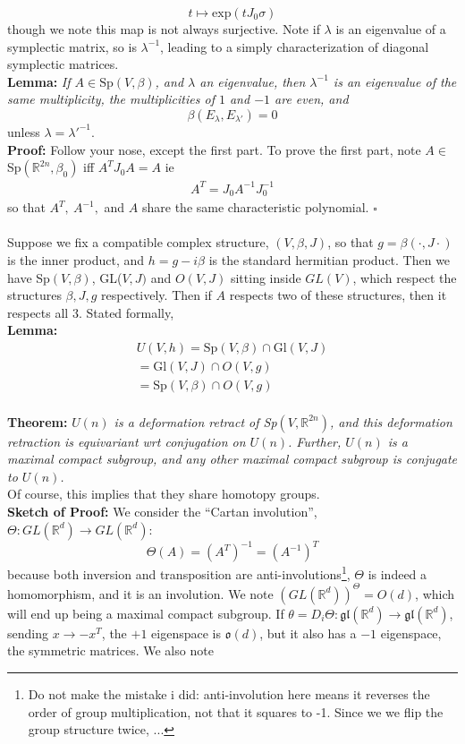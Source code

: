 \documentclass[12pt]{report}
\theoremstyle{definition}
\theoremstyle{remark}
\numberwithin{equation}{section}
\theoremstyle{definition}
\newcommand{\inv}[1]{#1^{-1}}
\newcommand{\bb}[1]{\mathbb{#1}}
\newcommand{\mqed}{\hfill\newline\null \hfill$\square$\\ }
\begin{document}
$$
	t \mapsto \text{exp}(tJ_0\sigma)
$$
though we note this map is not always surjective. Note if $\lambda$ is an eigenvalue of a symplectic matrix, so is $\inv \lambda$, leading to a simply characterization of diagonal symplectic matrices. \\
\textbf{Lemma: }\textit{If $A \in \text{Sp}(V,\beta)$, and $\lambda$ an eigenvalue, then $\inv \lambda$ is an eigenvalue of the same multiplicity, the multiplicities of $1$ and $-1$ are even, and }
$$
	\beta(E_\lambda, E_{\lambda'}) = 0
$$
unless $\lambda = \inv{\lambda'}$. \\
\textbf{Proof: }Follow your nose, except the first part. To prove the first part, note $A \in $ Sp$(\bb R^{2n}, \beta_0)$ iff $A^T J_0 A = A$ ie
\begin{gather*}
	A^T = J_0 \inv A \inv{J_0}
\end{gather*}
so that $A^T,\ \inv A,$ and $A$ share the same characteristic polynomial. \mqed
\\
Suppose we fix a compatible complex structure, $(V,\beta, J)$, so that $g = \beta(\cdot, J\cdot)$ is the inner product, and $h = g-i\beta$ is the standard hermitian product. Then we have Sp$(V,\beta)$, GL($V,J)$ and $O(V,J)$ sitting inside $GL(V)$, which respect the structures $\beta, J, g$ respectively. Then if $A$ respects two of these structures, then it respects all 3. Stated formally, \\
\textbf{Lemma: }
\begin{gather*}
		U(V,h) = \text{Sp}(V,\beta) \cap \text{Gl}(V,J)\\
		= \text{Gl}(V,J) \cap O(V,g)\\
		= \text{Sp}(V,\beta) \cap O(V,g)
\end{gather*}\\
\textbf{Theorem: }\textit{$U(n)$ is a deformation retract of Sp$(V,\bb R^{2n})$, and this deformation retraction is equivariant wrt conjugation on $U(n)$. Further, $U(n)$ is a maximal compact subgroup, and any other maximal compact subgroup is conjugate to $U(n)$. }\\
Of course, this implies that they share homotopy groups. \\
\textbf{Sketch of Proof: }We consider the ``Cartan involution'', $\Theta: GL(\bb R^d) \to GL(\bb R^d)$:
$$
	\Theta(A)= \inv{(A^T)} = (\inv A)^T
$$
because both inversion and transposition are anti-involutions\footnote{Do not make the mistake i did: anti-involution here means it reverses the order of group multiplication, not that it squares to -1. Since we we flip the group structure twice, ... }, $\Theta$ is indeed a homomorphism, and it is an involution. We note $(GL(\bb R^d))^\Theta = O(d)$, which will end up being a maximal compact subgroup. If $\theta = D_i \Theta: \mathfrak{gl}(\bb R^d) \to \mathfrak{gl}(\bb R^d)$, sending $x \to -x^T$, the $+1$ eigenspace is $\mathfrak{o}(d)$, but it also has a $-1$ eigenspace, the symmetric matrices. We also note 
\end{document}
